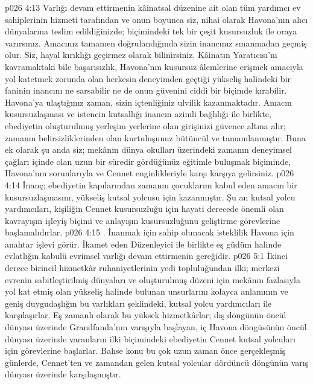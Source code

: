 \vs p026 4:13 Varlığı devam ettirmenin kâinatsal düzenine ait olan tüm yardımcı ev sahiplerinin hizmeti tarafından ve onun boyunca siz, nihai olarak Havona’nın alıcı dünyalarına teslim edildiğinizde;  biçimindeki tek bir çeşit kusursuzluk ile oraya varırsınız. Amacınız tamamen doğrulandığında sizin inancınız sınanmadan geçmiş olur. Siz, hayal kırıklığı geçirmez olarak bilinirsiniz. Kâinatın Yaratıcısı’nı kavramaktaki bile başarısızlık, Havona’nın kusursuz âlemlerine erişmek amacıyla yol katetmek zorunda olan herkesin deneyimden geçtiği yükseliş halindeki bir faninin inancını ne sarsabilir ne de onun güvenini ciddi bir biçimde kırabilir. Havona’ya ulaştığınız zaman, sizin içtenliğiniz ulvilik kazanmaktadır. Amacın kusursuzlaşması ve istencin kutsallığı inancın azimli bağlılığı ile birlikte, ebediyetin oluşturulmuş yerleşim yerlerine olan girişinizi güvence altına alır; zamanın belirsizliklerinden olan kurtuluşunuz bütüncül ve tamamlanmıştır. Buna ek olarak şu anda siz; mekânın dünya okulları üzerindeki zamanın deneyimsel çağları içinde olan uzun bir süredir gördüğünüz eğitimle buluşmak biçiminde, Havona’nın sorunlarıyla ve Cennet enginlikleriyle karşı karşıya gelirsiniz.
\vs p026 4:14 İnanç; ebediyetin kapılarından zamanın çocuklarını kabul eden amacın bir kusursuzlaşmasını, yükseliş kutsal yolcusu için kazanmıştır. Şu an kutsal yolcu yardımcıları, kişiliğin Cennet kusursuzluğu için hayati derecede önemli olan kavrayışın işleyiş biçimi ve anlayışın kusursuzluğunu geliştirme görevlerine başlamalıdırlar.
\vs p026 4:15 . İnanmak için sahip olunacak isteklilik Havona için anahtar işlevi görür. İkamet eden Düzenleyici ile birlikte eş güdüm halinde evlatlığın kabulü evrimsel varlığı devam ettirmenin gereğidir.
\vs p026 5:1 İkinci derece birincil hizmetkâr ruhaniyetlerinin yedi topluluğundan ilki; merkezi evrenin sabitleştirilmiş dünyaları ve oluşturulmuş düzeni için mekânın fazlasıyla yol kat etmiş olan yükseliş halinde bulunan unsurlarını kolayca anlamının ve geniş duygudaşlığın bu varlıkları şeklindeki, kutsal yolcu yardımcıları ile karşılaşırlar. Eş zamanlı olarak bu yüksek hizmetkârlar; dış döngünün öncül dünyası üzerinde Grandfanda’nın varışıyla başlayan, iç Havona döngüsünün öncül dünyası üzerinde varanların ilki biçimindeki ebediyetin Cennet kutsal yolcuları için görevlerine başlarlar. Bahse konu bu çok uzun zaman önce gerçekleşmiş günlerde, Cennet’ten ve zamandan gelen kutsal yolcular dördüncü döngünün varış dünyası üzerinde karşılaşmıştır.
